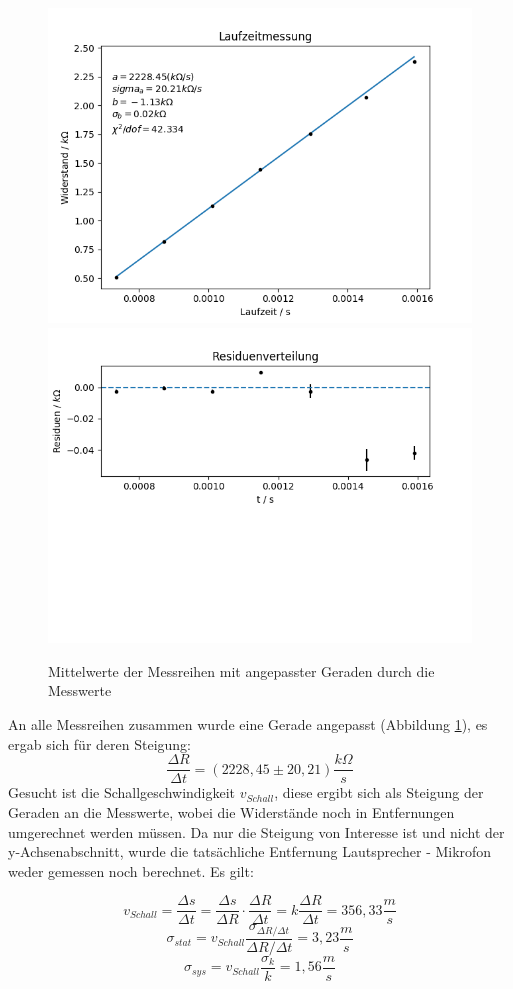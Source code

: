 \documentclass[12pt,a4paper]{article}
\begin{document}
	\begin{figure}
	\begin{center}	
		\includegraphics[width=0.6\linewidth]{fit_laufzeit}
		\includegraphics[width=0.6\linewidth]{residuen_laufzeit}
		\caption{Mittelwerte der Messreihen mit angepasster Geraden durch die Messwerte}
		\label{pic:fit_laufzeit}
		
		
	\end{center}
	\end{figure}
	An alle Messreihen zusammen wurde eine Gerade angepasst (Abbildung \ref{pic:fit_laufzeit}), es ergab sich für deren Steigung:
	\begin{equation}
	\frac{\Delta R}{\Delta t} = (2228,45 \pm 20,21) \frac{k\Omega}{s}
	\end{equation} 
	Gesucht ist die Schallgeschwindigkeit $v_{Schall}$, diese ergibt sich als Steigung der Geraden an die Messwerte, wobei die Widerstände noch in Entfernungen umgerechnet werden müssen. Da nur die Steigung von Interesse ist und nicht der y-Achsenabschnitt, wurde die tatsächliche  Entfernung Lautsprecher - Mikrofon weder gemessen noch berechnet. Es gilt:
	
	\begin{equation}
	v_{Schall} = \frac{\Delta s}{\Delta t} = \frac{\Delta s}{\Delta R} \cdot \frac{\Delta R}{\Delta t} = k \frac{\Delta R}{\Delta t} = 356,33 \frac{m}{s}
	\end{equation}
	\begin{equation}
	\sigma_{stat} = v_{Schall} \frac{\sigma _{\Delta R / \Delta t}}{\Delta R / \Delta t} = 3,23 \frac{m}{s}
	\end{equation}
	\begin{equation}
	\sigma_{sys} = v_{Schall} \frac{\sigma _k}{k} = 1,56 \frac{m}{s}
	\end{equation}
	
\end{document}
